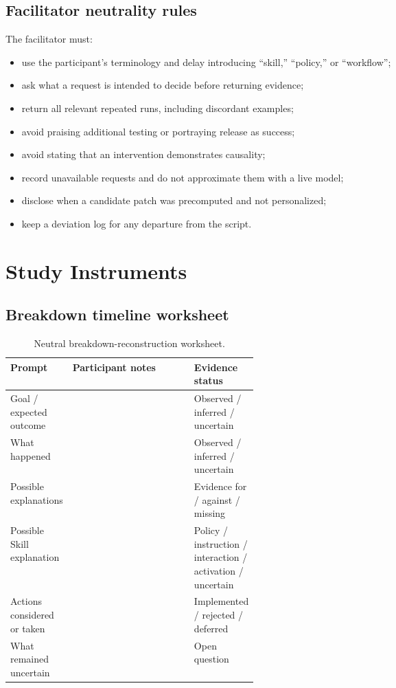\subsection{Facilitator neutrality rules}

The facilitator must:

\begin{itemize}[leftmargin=*]
    \item use the participant's terminology and delay introducing ``skill,''
    ``policy,'' or ``workflow'';
    \item ask what a request is intended to decide before returning evidence;
    \item return all relevant repeated runs, including discordant examples;
    \item avoid praising additional testing or portraying release as success;
    \item avoid stating that an intervention demonstrates causality;
    \item record unavailable requests and do not approximate them with a live
    model;
    \item disclose when a candidate patch was precomputed and not personalized;
    \item keep a deviation log for any departure from the script.
\end{itemize}

\section{Study Instruments}
\label{app:instruments}

\subsection{Breakdown timeline worksheet}

\begin{table}[h]
\centering
\caption{Neutral breakdown-reconstruction worksheet.}
\label{tab:timeline}
\small
\begin{tabularx}{\linewidth}{P{0.20\linewidth}Y P{0.22\linewidth}}
\toprule
\textbf{Prompt} & \textbf{Participant notes} & \textbf{Evidence status} \\
\midrule
Goal / expected outcome &  & Observed / inferred / uncertain \\
What happened &  & Observed / inferred / uncertain \\
Possible explanations &  & Evidence for / against / missing \\
Possible Skill explanation &  & Policy / instruction / interaction / activation / uncertain \\
Actions considered or taken &  & Implemented / rejected / deferred \\
What remained uncertain &  & Open question \\
\bottomrule
\end{tabularx}
\end{table}


